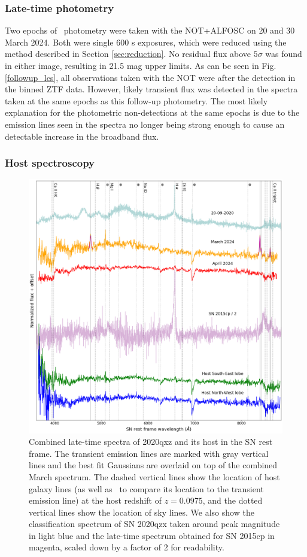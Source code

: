 \documentclass[a4paper,oneside,12pt, class=Latex/Classes/PhDthesisPSnPDF, crop=false]{standalone}
\begin{document}
\subsubsection{Late-time photometry}
Two epochs of \ztfi\ photometry were taken with the NOT+ALFOSC on 20 and 30 March 2024. Both were single 600 s exposures, which were reduced using the method described in Section \ref{sec:reduction}. No residual flux above $5\sigma$ was found in either image, resulting in 21.5 mag upper limits. As can be seen in Fig. \ref{followup_lcs}, all observations taken with the NOT were after the detection in the binned ZTF data. However, likely transient flux was detected in the spectra taken at the same epochs as this follow-up photometry. The most likely explanation for the photometric non-detections at the same epochs is due to the emission lines seen in the spectra no longer being strong enough to cause an detectable increase in the broadband flux. 


\subsubsection{Host spectroscopy}
\label{2020qxz_host_specs}
\begin{figure}
    \centering
    \includegraphics[width=\textwidth]{../Images/chapter_5/2020qxz_spec.png}
    \caption{Combined late-time spectra of 2020qxz and its host in the SN rest frame. The transient emission lines are marked with gray vertical lines and the best fit Gaussians are overlaid on top of the combined March spectrum. The dashed vertical lines show the location of host galaxy lines (as well as \Hbeta\ to compare its location to the transient emission line) at the host redshift of $z=0.0975$, and the dotted vertical lines show the location of sky lines. We also show the classification spectrum of SN 2020qzx taken around peak magnitude in light blue and the late-time spectrum obtained for SN 2015cp in magenta, scaled down by a factor of 2 for readability.}
    \label{fig:2020qxz_spec}
\end{figure}
\end{document}
